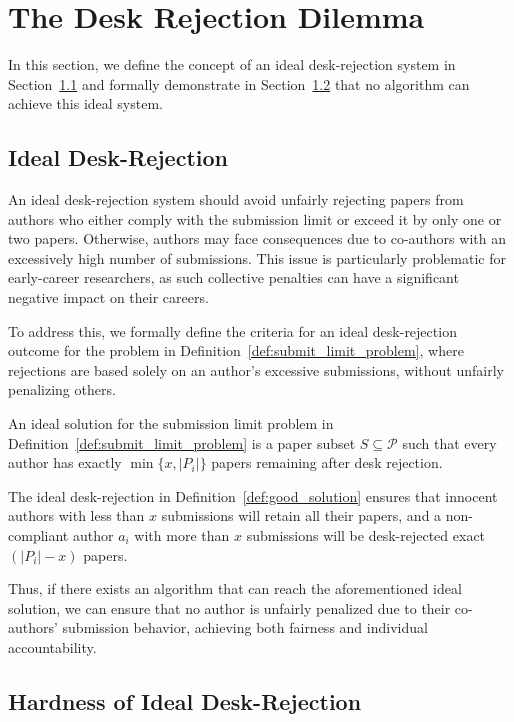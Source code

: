 \section{The Desk Rejection Dilemma}\label{sec:dr_dilemma}

In this section, we define the concept of an ideal desk-rejection system in Section~\ref{sec:good_solution} and formally demonstrate in Section~\ref{sec:good_solution_hard} that no algorithm can achieve this ideal system.

\subsection{Ideal Desk-Rejection}\label{sec:good_solution}
An ideal desk-rejection system should avoid unfairly rejecting papers from authors who either comply with the submission limit or exceed it by only one or two papers. Otherwise, authors may face consequences due to co-authors with an excessively high number of submissions. This issue is particularly problematic for early-career researchers, as such collective penalties can have a significant negative impact on their careers. 

To address this, we formally define the criteria for an ideal desk-rejection outcome for the problem in Definition~\ref{def:submit_limit_problem}, where rejections are based solely on an author’s excessive submissions, without unfairly penalizing others.

\begin{definition} \label{def:good_solution}
An ideal solution for the submission limit problem in Definition~\ref{def:submit_limit_problem} is a paper subset $S\subseteq \mathcal{P}$ such that every author has exactly $\min\{x, |P_i|\}$ papers remaining after desk rejection. 

\end{definition}
\begin{remark}
    The ideal desk-rejection in Definition~\ref{def:good_solution} ensures that innocent authors with less than $x$ submissions will retain all their papers, and a non-compliant author $a_i$ with more than $x$ submissions will be desk-rejected exact $(|P_i|-x)$ papers.
\end{remark}
Thus, if there exists an algorithm that can reach the aforementioned ideal solution, we can ensure that no author is unfairly penalized due to their co-authors' submission behavior, achieving both fairness and individual accountability.
\subsection{Hardness of Ideal Desk-Rejection}\label{sec:good_solution_hard}

